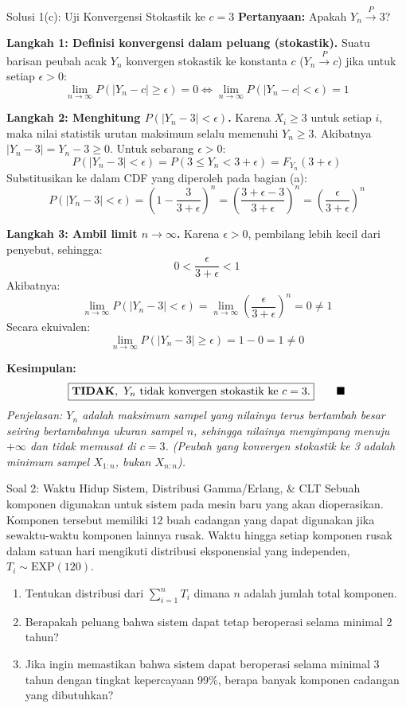 \documentclass[10pt,twoside]{article}
\begin{document}
\begin{solbox}{Solusi 1(c): Uji Konvergensi Stokastik ke $c = 3$}
\textbf{Pertanyaan:} Apakah $Y_n \xrightarrow{P} 3$?

\textbf{Langkah 1: Definisi konvergensi dalam peluang (stokastik).}
Suatu barisan peubah acak $Y_n$ konvergen stokastik ke konstanta $c$ ($Y_n \xrightarrow{P} c$) jika untuk setiap $\epsilon > 0$:
\[
\lim_{n \to \infty} P(|Y_n - c| \ge \epsilon) = 0 \iff \lim_{n \to \infty} P(|Y_n - c| < \epsilon) = 1
\]

\textbf{Langkah 2: Menghitung $P(|Y_n - 3| < \epsilon)$.}
Karena $X_i \ge 3$ untuk setiap $i$, maka nilai statistik urutan maksimum selalu memenuhi $Y_n \ge 3$. Akibatnya $|Y_n - 3| = Y_n - 3 \ge 0$.
Untuk sebarang $\epsilon > 0$:
\[
P(|Y_n - 3| < \epsilon) = P(3 \le Y_n < 3 + \epsilon) = F_{Y_n}(3 + \epsilon)
\]
Substitusikan ke dalam CDF yang diperoleh pada bagian (a):
\[
P(|Y_n - 3| < \epsilon) = \left(1 - \frac{3}{3 + \epsilon}\right)^n = \left(\frac{3 + \epsilon - 3}{3 + \epsilon}\right)^n = \left(\frac{\epsilon}{3 + \epsilon}\right)^n
\]

\textbf{Langkah 3: Ambil limit $n \to \infty$.}
Karena $\epsilon > 0$, pembilang lebih kecil dari penyebut, sehingga:
\[
0 < \frac{\epsilon}{3 + \epsilon} < 1
\]
Akibatnya:
\[
\lim_{n \to \infty} P(|Y_n - 3| < \epsilon) = \lim_{n \to \infty} \left(\frac{\epsilon}{3 + \epsilon}\right)^n = 0 \ne 1
\]
Secara ekuivalen:
\[
\lim_{n \to \infty} P(|Y_n - 3| \ge \epsilon) = 1 - 0 = 1 \ne 0
\]

\textbf{Kesimpulan:}
\[
\boxed{\text{\textbf{TIDAK}}, \ Y_n \ \text{tidak konvergen stokastik ke } c = 3.} \qquad \blacksquare
\]
\textit{Penjelasan: $Y_n$ adalah maksimum sampel yang nilainya terus bertambah besar seiring bertambahnya ukuran sampel $n$, sehingga nilainya menyimpang menuju $+\infty$ dan tidak memusat di $c = 3$. (Peubah yang konvergen stokastik ke 3 adalah minimum sampel $X_{1:n}$, bukan $X_{n:n}$).}
\end{solbox}

\begin{soalbox}{Soal 2: Waktu Hidup Sistem, Distribusi Gamma/Erlang, \& CLT}
Sebuah komponen digunakan untuk sistem pada mesin baru yang akan dioperasikan. Komponen tersebut memiliki 12 buah cadangan yang dapat digunakan jika sewaktu-waktu komponen lainnya rusak. Waktu hingga setiap komponen rusak dalam satuan hari mengikuti distribusi eksponensial yang independen, $T_i \sim \text{EXP}(120)$.
\begin{enumerate}[label=(\alph*)]
  \item Tentukan distribusi dari $\sum_{i=1}^{n} T_i$ dimana $n$ adalah jumlah total komponen.
  \item Berapakah peluang bahwa sistem dapat tetap beroperasi selama minimal 2 tahun?
  \item Jika ingin memastikan bahwa sistem dapat beroperasi selama minimal 3 tahun dengan tingkat kepercayaan 99\%, berapa banyak komponen cadangan yang dibutuhkan?
\end{enumerate}
\end{soalbox}
\end{document}
